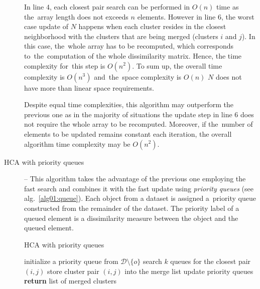 \begin{description}
	
	 In line $4$, each closest pair search can be performed in $O(n)$ time as the~array length does not exceeds $n$ elements. However in line $6$, the worst case update of $N$ happens when each cluster resides in the closest neighborhood with the clusters that are being merged (clusters $i$  and $j$). In this case, the~whole array has to be recomputed, which corresponds to~the~computation of the whole dissimilarity matrix. Hence, the time complexity for~this step is $O(n^2)$. To sum up, the overall time complexity is $O(n^3)$ and~the~space complexity is $O(n)$  $N$ does not have more than linear space requirements.
	 
	 \begin{rem}
	 	Despite \clen equal time complexities, this algorithm may outperform the previous one as in the majority of situations the update step in line $6$ does not require the whole array to be recomputed. Moreover, if the~number of elements to be updated remains constant each iteration, the overall algorithm time complexity may be $O(n^2)$. 
	 \end{rem}
	 
	 \item[HCA with priority queues] -- This algorithm takes the advantage of the previous one employing the fast search and combines it with the fast update using \emph{priority queues} (see alg.~\ref{alg01:queue}).
	 Each object from a dataset is assigned a~priority queue constructed from the remainder of the dataset. The priority label of a queued element is a dissimilarity measure between the object and the queued element. 
	 
	 \begin{algorithm}[t]
	 	\caption{HCA with priority queues }
	 	\label{alg01:queue}
	 	\begin{algorithmic}[1]
	 		\State initialize a priority queue from $\mathcal{D} \setminus \{o\}$
	 		\EndFor
	 		\State search $k$ queues for the closest pair $(i,j)$ 
	 		\State store cluster pair $(i,j)$ into the merge list 
	 		\State update  priority queues 
	 		\EndFor
	 		\State \textbf{return} list of merged clusters
	 		\EndProcedure
	 	\end{algorithmic}
	 \end{algorithm}
 

\end{description}
